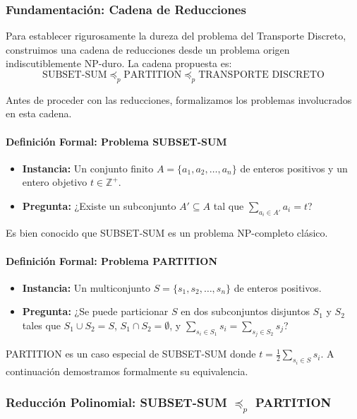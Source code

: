 \documentclass[12pt, a4paper]{article}
\begin{document}
    \subsubsection{Fundamentación: Cadena de Reducciones}
    Para establecer rigurosamente la dureza del problema del Transporte Discreto, construimos una cadena de reducciones desde un problema origen indiscutiblemente NP-duro. La cadena propuesta es:
    \[
    \text{SUBSET-SUM} \preceq_p \text{PARTITION} \preceq_p \text{TRANSPORTE DISCRETO}
    \]

    Antes de proceder con las reducciones, formalizamos los problemas involucrados en esta cadena.

    \paragraph{Definición Formal: Problema SUBSET-SUM}
    \begin{itemize}
        \item \textbf{Instancia:} Un conjunto finito $A = \{a_1, a_2, \ldots, a_n\}$ de enteros positivos y un entero objetivo $t \in \mathbb{Z}^+$.
        \item \textbf{Pregunta:} ¿Existe un subconjunto $A' \subseteq A$ tal que $\sum_{a_i \in A'} a_i = t$?
    \end{itemize}

    Es bien conocido que SUBSET-SUM es un problema NP-completo clásico.

    \paragraph{Definición Formal: Problema PARTITION}
    \begin{itemize}
        \item \textbf{Instancia:} Un multiconjunto $S = \{s_1, s_2, \ldots, s_n\}$ de enteros positivos.
        \item \textbf{Pregunta:} ¿Se puede particionar $S$ en dos subconjuntos disjuntos $S_1$ y $S_2$ tales que $S_1 \cup S_2 = S$, $S_1 \cap S_2 = \emptyset$, y $\sum_{s_i \in S_1} s_i = \sum_{s_j \in S_2} s_j$?
    \end{itemize}

    PARTITION es un caso especial de SUBSET-SUM donde $t = \frac{1}{2}\sum_{s_i \in S} s_i$. A continuación demostramos formalmente su equivalencia.

    \subsubsection{Reducción Polinomial: SUBSET-SUM $\preceq_p$ PARTITION}
\end{document}
